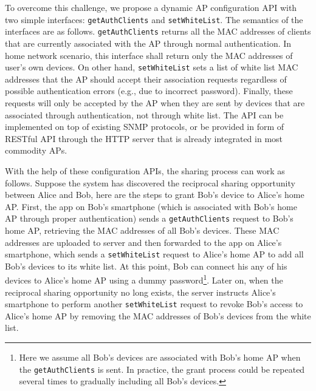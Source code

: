 To overcome this challenge, we propose a dynamic \wifi{} AP configuration API
with two simple interfaces: \texttt{getAuthClients} and \texttt{setWhiteList}.
The semantics of the interfaces are as follows.  \texttt{getAuthClients} 
returns all the MAC addresses of clients that are currently associated with the
AP through normal authentication. In home \wifi{} network scenario, this
interface shall return only the MAC addresses of user's own \wifi{} devices.  On
other hand, \texttt{setWhiteList} sets a list of white list MAC addresses that
the AP should accept their association requests regardless of possible
authentication errors (e.g., due to incorrect \wifi{} password). Finally, these
requests will only be accepted by the AP when they are sent by devices that are
associated through authentication, not through white list. The API can be
implemented on top of existing SNMP protocols, or be provided in form of RESTful
API through the HTTP server that is already integrated in most commodity APs.

With the help of these configuration APIs, the \wifi{} sharing process can work
as follows. Suppose the \wisefi{} system has discovered the reciprocal sharing
opportunity between Alice and Bob, here are the steps to grant Bob's device to
Alice's home AP. First, the \wisefi{} app on Bob's smartphone (which is
associated with Bob's home AP through proper authentication) sends a
\texttt{getAuthClients} request to Bob's home AP, retrieving the MAC addresses
of all Bob's devices. These MAC addresses are uploaded to \wisefi{} server and
then forwarded to the \wisefi{} app on Alice's smartphone, which sends a
\texttt{setWhiteList} request to Alice's home AP to add all Bob's devices to its
white list. At this point, Bob can connect his any of his devices to Alice's
home AP using a dummy password\footnote{Here we assume all Bob's devices are
associated with Bob's home AP when the \texttt{getAuthClients} is sent. In
practice, the grant process could be repeated several times to gradually
including all Bob's devices.}. Later on, when the reciprocal sharing
opportunity no long exists, the \wisefi{} server instructs Alice's smartphone to
perform another \texttt{setWhiteList} request to revoke Bob's access to Alice's
home AP by removing the MAC addresses of Bob's devices from the white list.

